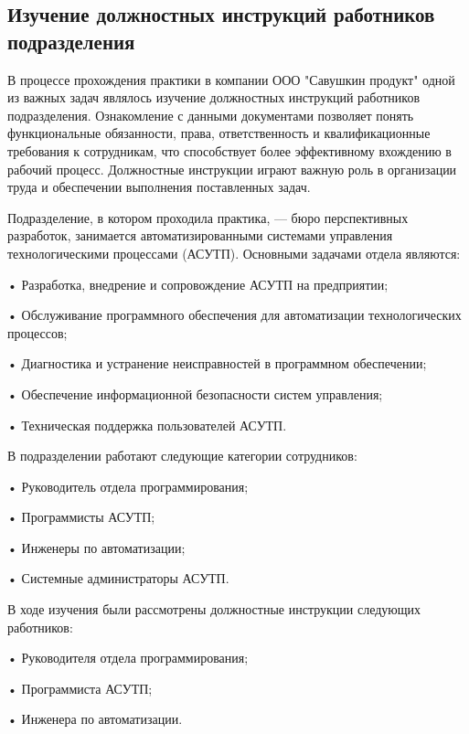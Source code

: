 \subtitlespace

\subsection*{ 
  \gostTitleFont
   Изучение должностных инструкций работников подразделения
} 

\subtitlespace

{\gostFont

  \par \redline В процессе прохождения практики в компании ООО "Савушкин продукт" одной из важных задач являлось изучение должностных инструкций работников подразделения. Ознакомление с данными документами позволяет понять функциональные обязанности, права, ответственность и квалификационные требования к сотрудникам, что способствует более эффективному вхождению в рабочий процесс. Должностные инструкции играют важную роль в организации труда и обеспечении выполнения поставленных задач. 

  \par \redline Подразделение, в котором проходила практика, — бюро перспективных разработок, занимается автоматизированными системами управления технологическими процессами (АСУТП). Основными задачами отдела являются:
  \par \redline • Разработка, внедрение и сопровождение АСУТП на предприятии;
  \par \redline • Обслуживание программного обеспечения для автоматизации технологических процессов;
  \par \redline • Диагностика и устранение неисправностей в программном обеспечении;
  \par \redline • Обеспечение информационной безопасности систем управления;
  \par \redline • Техническая поддержка пользователей АСУТП.

  \par \redline В подразделении работают следующие категории сотрудников:
  \par \redline • Руководитель отдела программирования;
  \par \redline • Программисты АСУТП;
  \par \redline • Инженеры по автоматизации;
  \par \redline • Системные администраторы АСУТП.

  \par \redline В ходе изучения были рассмотрены должностные инструкции следующих работников:
  \par \redline • Руководителя отдела программирования;
  \par \redline • Программиста АСУТП;
  \par \redline • Инженера по автоматизации.

}

